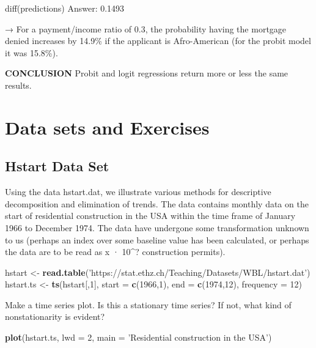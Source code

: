 \documentclass[
]{article}
\newenvironment{Shaded}{\begin{snugshade}}{\end{snugshade}}
\newcommand{\DataTypeTok}[1]{\textcolor[rgb]{0.13,0.29,0.53}{#1}}
\newcommand{\DecValTok}[1]{\textcolor[rgb]{0.00,0.00,0.81}{#1}}
\newcommand{\KeywordTok}[1]{\textcolor[rgb]{0.13,0.29,0.53}{\textbf{#1}}}
\newcommand{\NormalTok}[1]{#1}
\newcommand{\StringTok}[1]{\textcolor[rgb]{0.31,0.60,0.02}{#1}}
\begin{document}
diff(predictions) Answer: 0.1493

→ For a payment/income ratio of 0.3, the probability having the mortgage
denied increases by 14.9\% if the applicant is Afro-American (for the
probit model it was 15.8\%).

\textbf{CONCLUSION} Probit and logit regressions return more or less the
same results.

\hypertarget{data-sets-and-exercises}{%
\section{Data sets and Exercises}\label{data-sets-and-exercises}}

\hypertarget{hstart-data-set}{%
\subsection{Hstart Data Set}\label{hstart-data-set}}

Using the data hstart.dat, we illustrate various methods for descriptive
decomposition and elimination of trends. The data contains monthly data
on the start of residential construction in the USA within the time
frame of January 1966 to December 1974. The data have undergone some
transformation unknown to us (perhaps an index over some baseline value
has been calculated, or perhaps the data are to be read as x · 10\^{}?
construction permits).

\begin{Shaded}
\begin{Highlighting}[]
\NormalTok{hstart <-}\StringTok{ }\KeywordTok{read.table}\NormalTok{(}\StringTok{'https://stat.ethz.ch/Teaching/Datasets/WBL/hstart.dat'}\NormalTok{)}
\NormalTok{hstart.ts <-}\StringTok{ }\KeywordTok{ts}\NormalTok{(hstart[,}\DecValTok{1}\NormalTok{], }\DataTypeTok{start =} \KeywordTok{c}\NormalTok{(}\DecValTok{1966}\NormalTok{,}\DecValTok{1}\NormalTok{), }\DataTypeTok{end =} \KeywordTok{c}\NormalTok{(}\DecValTok{1974}\NormalTok{,}\DecValTok{12}\NormalTok{), }\DataTypeTok{frequency =} \DecValTok{12}\NormalTok{)}
\end{Highlighting}
\end{Shaded}

Make a time series plot. Is this a stationary time series? If not, what
kind of nonstationarity is evident?

\begin{Shaded}
\begin{Highlighting}[]
\KeywordTok{plot}\NormalTok{(hstart.ts, }\DataTypeTok{lwd =} \DecValTok{2}\NormalTok{, }\DataTypeTok{main =} \StringTok{'Residential construction in the USA'}\NormalTok{)}
\end{Highlighting}
\end{Shaded}
\end{document}
